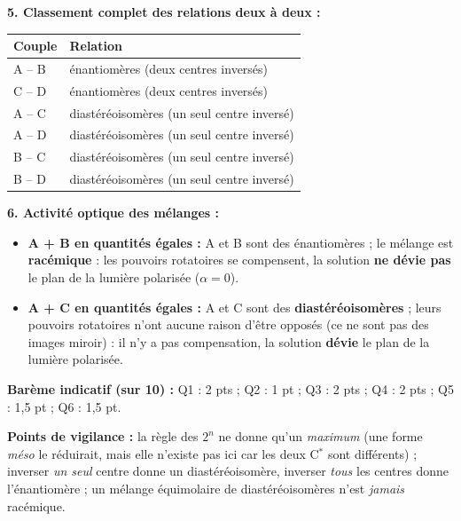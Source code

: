 \documentclass[11pt]{article}
\begin{document}
\begin{corrige}
\textbf{5. Classement complet des relations deux à deux :}
\begin{center}
\begin{tabularx}{\linewidth}{|l|X|}
\hline
\rowcolor{popblueL} \textbf{Couple} & \textbf{Relation} \\
\hline
A -- B & énantiomères (deux centres inversés) \\
\hline
C -- D & énantiomères (deux centres inversés) \\
\hline
A -- C & diastéréoisomères (un seul centre inversé) \\
\hline
A -- D & diastéréoisomères (un seul centre inversé) \\
\hline
B -- C & diastéréoisomères (un seul centre inversé) \\
\hline
B -- D & diastéréoisomères (un seul centre inversé) \\
\hline
\end{tabularx}
\end{center}

\textbf{6. Activité optique des mélanges :}
\begin{itemize}
\item \textbf{A + B en quantités égales :} A et B sont des énantiomères ; le mélange est \textbf{racémique} : les pouvoirs rotatoires se compensent, la solution \textbf{ne dévie pas} le plan de la lumière polarisée ($\alpha = 0$).
\item \textbf{A + C en quantités égales :} A et C sont des \textbf{diastéréoisomères} ; leurs pouvoirs rotatoires n'ont aucune raison d'être opposés (ce ne sont pas des images miroir) : il n'y a pas compensation, la solution \textbf{dévie} le plan de la lumière polarisée.
\end{itemize}

\medskip
\textbf{Barème indicatif (sur 10) :} Q1 : 2 pts ; Q2 : 1 pt ; Q3 : 2 pts ; Q4 : 2 pts ; Q5 : 1,5 pt ; Q6 : 1,5 pt.

\textbf{Points de vigilance :} la règle des $2^n$ ne donne qu'un \emph{maximum} (une forme \emph{méso} le réduirait, mais elle n'existe pas ici car les deux C$^*$ sont différents) ; inverser \emph{un seul} centre donne un diastéréoisomère, inverser \emph{tous} les centres donne l'énantiomère ; un mélange équimolaire de diastéréoisomères n'est \emph{jamais} racémique.
\end{corrige}
\end{document}

